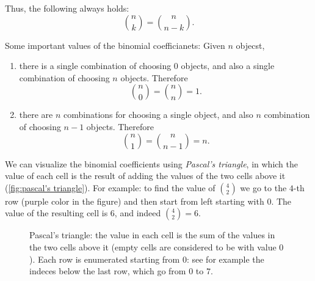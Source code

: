 Thus, the following always holds:
\begin{equation}
	\binom{n}{k} = \binom{n}{n-k}.
	\label{eq:binom_symmetry}
\end{equation}

\begin{note}{}{}
	Some important values of the binomial coefficianets: Given $n$ objecst,
	\begin{enumerate}
		\item there is a single combination of choosing $0$ objects, and also a single combination of choosing $n$ objects. Therefore
			\[
				\binom{n}{0}=\binom{n}{n}=1.
			\]

		\item there are $n$ combinations for choosing a single object, and also $n$ combination of choosing $n-1$ objects. Therefore
			\[
				\binom{n}{1} = \binom{n}{n-1} = n.
			\]
	\end{enumerate}
\end{note}

We can visualize the binomial coefficients using \emph{Pascal's triangle}, in which the value of each cell is the result of adding the values of the two cells above it (\autoref{fig:pascal's triangle}). For example: to find the value of $\binom{4}{2}$ we go to the $4$-th row (purple color in the figure) and then start from left starting with $0$. The value of the resulting cell is $6$, and indeed $\binom{4}{2}=6$.

\begin{figure}
	\centering
	\caption{Pascal's triangle: the value in each cell is the sum of the values in the two cells above it (empty cells are considered to be with value $0$). Each row is enumerated starting from $0$: see for example the indeces below the last row, which go from $0$ to $7$.}
	\label{fig:pascal's triangle}
\end{figure}

